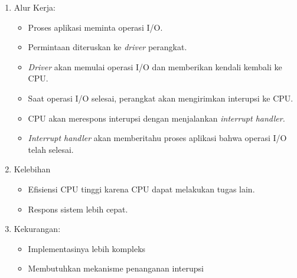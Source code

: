 \documentclass[12pt]{article}
\begin{document}
\begin{enumerate}
\begin{enumerate}
        \item Alur Kerja:
        \begin{itemize}
            \item Proses aplikasi meminta operasi I/O.
            \item Permintaan diteruskan ke \textit{driver} perangkat.
            \item \textit{Driver} akan memulai operasi I/O dan memberikan kendali kembali ke CPU.
            \item Saat operasi I/O selesai, perangkat akan mengirimkan interupsi ke CPU.
            \item CPU akan merespons interupsi dengan menjalankan \emph{interrupt handler.}
            \item \emph{Interrupt handler} akan memberitahu proses aplikasi bahwa operasi I/O telah selesai. 
        \end{itemize}

        \item Kelebihan
        \begin{itemize}
            \item Efisiensi CPU tinggi karena CPU dapat melakukan tugas lain.
            \item Respons sistem lebih cepat.
        \end{itemize}

        \item Kekurangan:
        \begin{itemize}
            \item Implementasinya lebih kompleks
            \item Membutuhkan mekanisme penanganan interupsi
        \end{itemize}
    \end{enumerate}
\end{enumerate}
\end{document}
